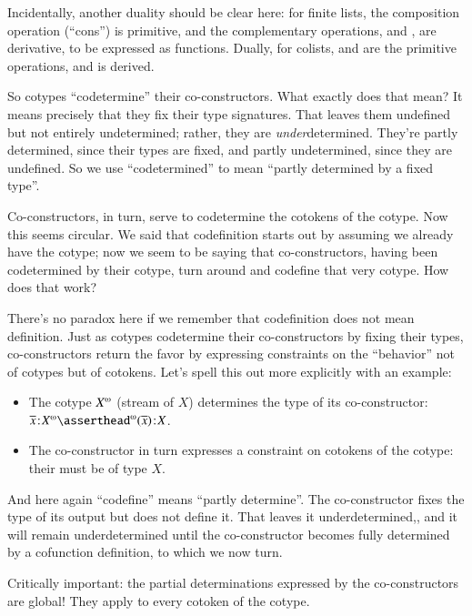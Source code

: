 Incidentally, another duality should be clear here: for finite lists,
the composition operation (``cons'') is primitive, and the
complementary operations, \head{} and \tail{}, are derivative, to be
expressed as functions. Dually, for colists, \cohead{} and \cotail{}
are the primitive operations, and \cocons{} is derived.

So cotypes ``codetermine'' their co-constructors. What exactly does
that mean? It means precisely that they fix their type signatures.
That leaves them undefined but not entirely undetermined; rather, they
are \textit{under}determined. They're partly determined, since their
types are fixed, and partly undetermined, since they are undefined. So
we use ``codetermined'' to mean ``partly determined by a fixed
type''.

Co-constructors, in turn, serve to codetermine the cotokens of the
cotype. Now this seems circular. We said that codefinition starts out
by assuming we already have the cotype; now we seem to be saying that
co-constructors, having been codetermined by their cotype, turn around
and codefine that very cotype. How does that work?

There's no paradox here if we remember that codefinition does not mean
definition. Just as cotypes codetermine their co-constructors by
fixing their types, co-constructors return the favor by expressing
constraints on the ``behavior'' not of cotypes but of cotokens. Let's spell this out more explicitly with an example:

\begin{itemize}
\item The cotype \(\colist{X}\) (stream of \(X\)) determines the type of
  its \cohead{} co-constructor:
  \(\tj{\cotok{x}}{\colist{X}}\linfer\tj{\cohead(\cotok{x})}{X}\).
  \item The co-constructor in turn expresses a constraint on cotokens
    of the cotype: their \cohead{} must be of type \(X\).
\end{itemize}

And here again ``codefine'' means ``partly determine''. The
co-constructor fixes the type of its output but does not define it.
That leaves it underdetermined,, and it will remain underdetermined
until the co-constructor becomes fully determined by a cofunction
definition, to which we now turn.

Critically important: the partial determinations expressed by the
co-constructors are global! They apply to every cotoken of the cotype.

